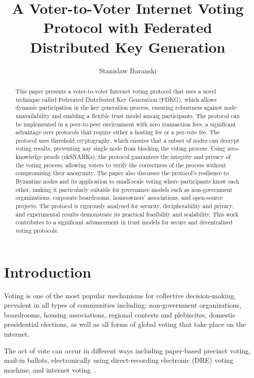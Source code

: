 \documentclass[runningheads]{llncs}
\title{A Voter-to-Voter Internet Voting Protocol with Federated Distributed Key Generation}
\author{Stanislaw Baranski\inst{1}}
\institute{Gdansk University of Technology, Narutowicza 11/12 80-233, Gdansk, Poland \email{stanislaw.baranski@pg.edu.pl}}
\begin{document}
\maketitle


\begin{abstract}
This paper presents a voter-to-voter Internet voting protocol that uses a novel technique called Federated Distributed Key Generation (FDKG), which allows dynamic participation in the key generation process, ensuring robustness against node unavailability and enabling a flexible trust model among participants. The protocol can be implemented in a peer-to-peer environment with zero transaction fees, a significant advantage over protocols that require either a hosting fee or a per-vote fee. The protocol uses threshold cryptography, which ensures that a subset of nodes can decrypt voting results, preventing any single node from blocking the voting process. Using zero-knowledge proofs (zkSNARKs), the protocol guarantees the integrity and privacy of the voting process, allowing voters to verify the correctness of the process without compromising their anonymity. The paper also discusses the protocol's resilience to Byzantine nodes and its application to small-scale voting where participants know each other, making it particularly suitable for governance models such as non-government organizations, corporate boardrooms, homeowners' associations, and open-source projects. The protocol is rigorously analysed for security, decipherability and privacy, and experimental results demonstrate its practical feasibility and scalability. This work contributes to a significant advancement in trust models for secure and decentralised voting protocols.
\end{abstract}


\section{Introduction}
Voting is one of the most popular mechanisms for collective decision-making, prevalent in all types of communities including: non-government organizations, boardrooms, housing associations, regional contests and plebiscites, domestic presidential elections, as well as all forms of global voting that take place on the internet.

The act of vote can occur in different ways including paper-based precinct voting, mail-in ballots, electronically using direct-recording electronic (DRE) voting machine, and internet voting~\cite{parkGoingBadWorse2021}.
\end{document}
